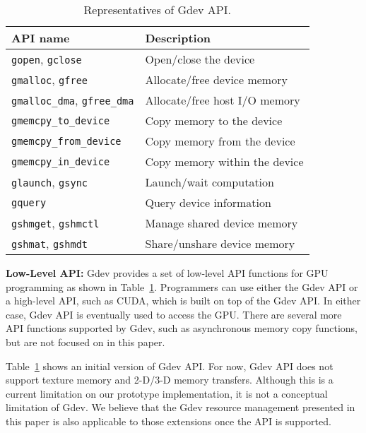 \begin{table}[t]
 \caption{Representatives of Gdev API.}
 \label{tab:gdev_api}
 \begin{center}
  {\footnotesize
  \begin{tabular}{|l|l|}
   \hline
   \textbf{API name} & \textbf{Description}\\
   \hline
   \texttt{gopen}, \texttt{gclose} & Open/close the device\\
   \hline
   \texttt{gmalloc}, \texttt{gfree} & Allocate/free device memory\\
   \hline
   \texttt{gmalloc\_dma}, \texttt{gfree\_dma} & Allocate/free host I/O memory\\
   \hline
   \texttt{gmemcpy\_to\_device} & Copy memory to the device\\
   \hline
   \texttt{gmemcpy\_from\_device} & Copy memory from the device\\
   \hline
   \texttt{gmemcpy\_in\_device} & Copy memory within the device\\
   \hline
   \texttt{glaunch}, \texttt{gsync} & Launch/wait computation\\
   \hline
   \texttt{gquery} & Query device information\\
   \hline
   \texttt{gshmget}, \texttt{gshmctl} & Manage shared device memory\\
   \hline
   \texttt{gshmat}, \texttt{gshmdt} & Share/unshare device memory\\
   \hline
  \end{tabular}
  }
 \end{center}
\vspace{-1em}
\end{table}

\textbf{Low-Level API:}
Gdev provides a set of low-level API functions for GPU programming as
shown in Table~\ref{tab:gdev_api}.
Programmers can use either the Gdev API or a high-level API, such as
CUDA, which is built on top of the Gdev API.
In either case, Gdev API is eventually used to access the GPU.
There are several more API functions supported by Gdev, such as
asynchronous memory copy functions, but are not focused on in this
paper.

Table~\ref{tab:gdev_api} shows an initial version of Gdev API.
For now, Gdev API does not support texture memory and 2-D/3-D memory
transfers.
Although this is a current limitation on our prototype implementation,
it is not a conceptual limitation of Gdev.
We believe that the Gdev resource management presented in this paper is
also applicable to those extensions once the API is supported.

